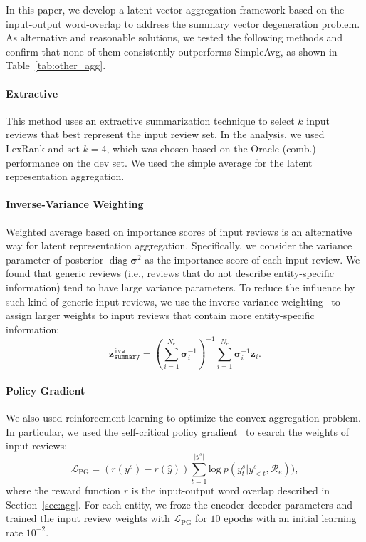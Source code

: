 \documentclass[11pt]{article}
\newcommand{\simpleavg}{\mbox{SimpleAvg}}
\begin{document}
In this paper, we develop a latent vector aggregation framework based on the input-output word-overlap to address the summary vector degeneration problem. As alternative and reasonable solutions, we tested the following methods and confirm that none of them consistently outperforms \simpleavg, as shown in Table~\ref{tab:other_agg}.

\paragraph{Extractive} This method uses an extractive summarization technique to select $k$ input reviews that best represent the input review set. In the analysis, we used LexRank and set $k=4$, which was chosen based on the Oracle (comb.) performance on the dev set. We used the simple average for the latent representation aggregation.

\paragraph{Inverse-Variance Weighting}
Weighted average based on importance scores of input reviews is an alternative way for latent representation aggregation.
Specifically, we consider the variance parameter of posterior $\operatorname{diag}\boldsymbol{\sigma}^2$ as the importance score of each input review.
We found that generic reviews (i.e., reviews that do not describe entity-specific information) tend to have  large variance parameters. To reduce the influence by such kind of generic input reviews,
we use the inverse-variance weighting~\cite{cochran1954combination} to assign larger weights to input reviews that contain more entity-specific information:
\[\textstyle
    \boldsymbol{z}_{\texttt{summary}}^{\texttt{ivw}} = \left(\sum_{i = 1}^{N_e} \boldsymbol{\sigma}_{i}^{-1}\right)^{-1} \sum_{i=1}^{N_e} \boldsymbol{\sigma}_{i}^{-1} \boldsymbol{z}_{i}.
\]

\paragraph{Policy Gradient} We also used reinforcement learning to optimize the convex aggregation problem.
In particular, we used the self-critical policy gradient~\citep[PG;][]{rennie2017self, paulus2018deep} to search the weights of input reviews:
\[\textstyle
    \mathcal{L}_{\text{PG}} = (r(y^s)- r(\hat{y}))\sum_{t=1}^{|y^s|}\text{log}~p(y^s_t|y^s_{<t},\mathcal{R}_e)),
\]
where the reward function $r$ is the input-output word overlap described in Section~\ref{sec:agg}. For each entity, we froze the encoder-decoder parameters and trained the input review weights with $\mathcal{L}_{\text{PG}}$ for $10$ epochs with an initial learning rate $10^{-2}$.
\end{document}
